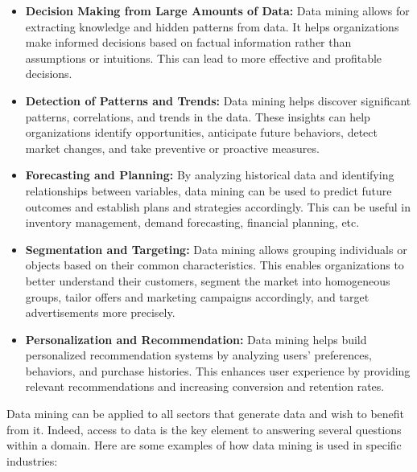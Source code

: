 \begin{itemize}
	\item \textbf{Decision Making from Large Amounts of Data:} Data mining allows for extracting knowledge and hidden patterns from data. It helps organizations make informed decisions based on factual information rather than assumptions or intuitions. This can lead to more effective and profitable decisions.
	
	\item \textbf{Detection of Patterns and Trends:} Data mining helps discover significant patterns, correlations, and trends in the data. These insights can help organizations identify opportunities, anticipate future behaviors, detect market changes, and take preventive or proactive measures.
	
	\item \textbf{Forecasting and Planning:} By analyzing historical data and identifying relationships between variables, data mining can be used to predict future outcomes and establish plans and strategies accordingly. This can be useful in inventory management, demand forecasting, financial planning, etc.
	
	\item \textbf{Segmentation and Targeting:} Data mining allows grouping individuals or objects based on their common characteristics. This enables organizations to better understand their customers, segment the market into homogeneous groups, tailor offers and marketing campaigns accordingly, and target advertisements more precisely.
	
	\item \textbf{Personalization and Recommendation:} Data mining helps build personalized recommendation systems by analyzing users' preferences, behaviors, and purchase histories. This enhances user experience by providing relevant recommendations and increasing conversion and retention rates.
\end{itemize}


Data mining can be applied to all sectors that generate data and wish to benefit from it. Indeed, access to data is the key element to answering several questions within a domain. Here are some examples of how data mining is used in specific industries:

